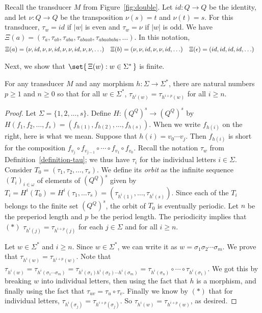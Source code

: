 \begin{example}\label{ann_ex:tau_and_theta'}
  Recall the transducer $M$ from Figure~\ref{fig:double}. Let $id: Q \to Q$ be the identity, 
  and let $\nu: Q \to Q$ be the transposition $\nu(s) = t$ and $\nu(t) = s$. 
  For this transducer, 
  $\tau_w = id$ if  $|w|$ is even and $\tau_w = \nu$ if  $|w|$ is odd.
We have $\Xi(a) = (\tau_a, \tau_{ab}, \tau_{aba}, \tau_{abaab}, \tau_{abaababa}, \ldots)$.
  In this notation,
  \begin{align*}
    \Xi(a) & = (\nu, id, \nu, \nu, id, \nu, \nu, id, \nu, \nu, \ldots) &
    \Xi(b) & =  (\nu, \nu, id, \nu, \nu, id, \ldots) &
    \Xi(\epsilon) & =  (id, id, id, id, \ldots)
  \end{align*}
\end{example}

Next, we show that $\set{\,\Xi(w) : w \in \Sigma^*\,}$ is finite.

\begin{lemma}\label{lem:finite_annotation_exists}
  For any  transducer $M$ and any morphism $h:\Sigma\to\Sigma^*$,  
  there are natural numbers $p \geq 1$ and $n \geq 0$ so that for all $w \in \Sigma^*$, 
  $\tau_{h^i(w)} = \tau_{h^{i+p}(w)}$ for all $i \geq n$.
\end{lemma}

\begin{proof}
  Let $\Sigma = \{1, 2, \ldots, s\}$. Define $H: (Q^Q)^{s} \to (Q^Q)^{s}$ by 
  $H(f_1, f_2, \ldots, f_{s}) =  (f_{h(1)}, f_{h(2)}, \ldots, f_{h(s)})$.
When we write $f_{h(i)}$ on the right, here is what we mean.  Suppose that $h(i) = v_0\cdots v_j$.
  Then $f_{h(i)}$ is short for the composition $f_{v_j} \circ f_{v_{j-1}} \circ \cdots \circ f_{v_1} \circ f_{v_0}$.
  Recall the notation $\tau_w$ from Definition~\ref{definition-tau}; we thus have $\tau_i$ for  the individual letters $i\in\Sigma$.
  Consider $T_0 = (\tau_1, \tau_2, \ldots, \tau_{s})$.   We define its \emph{orbit} as 
  the infinite sequence $(T_i)_{i\in\omega}$ of elements of $ (Q^Q)^{s}$ given by
  $T_i =  H^i(T_0) =  H^i(\tau_1, \ldots \tau_{s}) =  (\tau_{h^i(1)}, \ldots, \tau_{h^i(s)})$.
Since each of the $T_i$ belongs to the finite set $(Q^Q)^{s}$,  the orbit of $T_0$ is eventually periodic. 
  Let $n$ be the preperiod length and $p$ be the period length. The
  periodicity implies that $(*)$ $\tau_{h^i(j)} = \tau_{h^{i+p}(j)}$ for each $j \in \Sigma$ and for all $i \geq n$.


  Let $w \in \Sigma^*$ and $i \geq n$. Since $w \in \Sigma^*$, we can write it as $w = \sigma_1\sigma_2 \cdots \sigma_m$.
  We prove that 
  $\tau_{h^i(w)} = \tau_{h^{i+p}(w)}$. 
  Note that
  $\tau_{h^i(w)} =  \tau_{h^i(\sigma_1 \cdots \sigma_m)} =  \tau_{h^i(\sigma_1)h^i(\sigma_2) \cdots h^i(\sigma_m)}
  =  \tau_{h^i(\sigma_n)}\circ\cdots\circ\tau_{h^i(\sigma_1)}$.
We got this  by breaking $w$ into individual letters, then using the fact that $h$ is a morphism, and finally using 
  the fact that $\tau_{u v} = \tau_u\circ\tau_v$.
  Finally we know by $(*)$ that for individual letters,
  $\tau_{h^i(\sigma_j)} = \tau_{h^{i+p}(\sigma_j)}$.
  So  $\tau_{h^i(w)} = \tau_{h^{i+p}(w)}$, as desired.
\end{proof}

